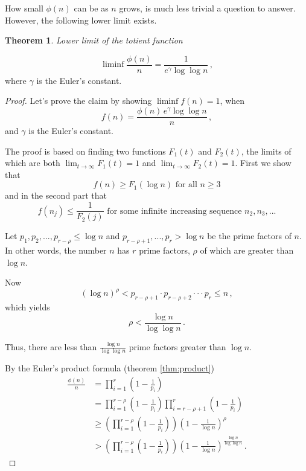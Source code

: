 \documentclass{article}
\theoremstyle{definition}
\newtheorem{theorem}[subsubsection]{Theorem}
\begin{document}
How small $\phi(n)$ can be as $n$ grows, is much less trivial a question to answer. However, the following lower limit exists.

\begin{theorem}{\emph{Lower limit of the totient function}}

\begin{equation*}
    \liminf{\frac{\phi(n)}{n}}=\frac{1}{e^\gamma\log\log n}\,,
\end{equation*}
where $\gamma$ is the Euler's constant.

\begin{proof}

Let's prove the claim by showing $\liminf{f(n)} = 1$, when
\begin{equation*}
    f(n)= \frac{\phi(n)\,e^\gamma \log\log n}{n}\,,
\end{equation*}
and $\gamma$ is the Euler's constant.

The proof is based on finding two functions $F_1(t)$ and $F_2(t)$, the limits of which are both $\lim_{t\rightarrow \infty} F_1(t) = 1$ and $\lim_{t\rightarrow \infty} F_2(t) = 1$. First we show that 
\begin{equation}
\label{eq:first}
    f(n) \geq F_1(\log n)\text{ for all }n\geq 3
\end{equation}
and in the second part that
\begin{equation}
\label{eq:second}
    f(n_j) \leq \frac{1}{F_2(j)}\text{ for some infinite increasing sequence }n_2, n_3,...
\end{equation}

Let $p_1,p_2,...,p_{r-\rho} \leq \log n$ and $p_{r-\rho+1},...,p_r > \log n$ be the prime factors of $n$. In other words, the number $n$ has $r$ prime factors, $\rho$ of which are greater than $\log n$.

Now
\begin{equation*}
    (\log n)^\rho < p_{r-\rho+1} \cdot p_{r-\rho+2} \cdot \cdot \cdot p_r \leq n\,,
\end{equation*}
which yields
\begin{equation*}
    \rho < \frac{\log n}{\log\log n}\,.
\end{equation*}

Thus, there are less than $\frac{\log n}{\log\log n}$ prime factors greater than $\log n$.

By the Euler's product formula (theorem \ref{thm:product})
\begin{align*}
    \frac{\phi(n)}{n} & = \prod_{i=1}^r\left(1-\frac{1}{p_i}\right)\\
    & = \prod_{i=1}^{r-\rho}\left(1-\frac{1}{p_i}\right) \prod_{i=r-\rho+1}^r\left(1-\frac{1}{p_i}\right)\\
    & \geq \left(\prod_{i=1}^{r-\rho}\left(1-\frac{1}{p_i}\right)\right) \left(1-\frac{1}{\log n}\right)^\rho\\
    & > \left(\prod_{i=1}^{r-\rho}\left(1-\frac{1}{p_i}\right)\right) \left(1-\frac{1}{\log n}\right)^\frac{\log n}{\log \log n}\,.
\end{align*}


\end{proof}
\end{theorem}
\end{document}
